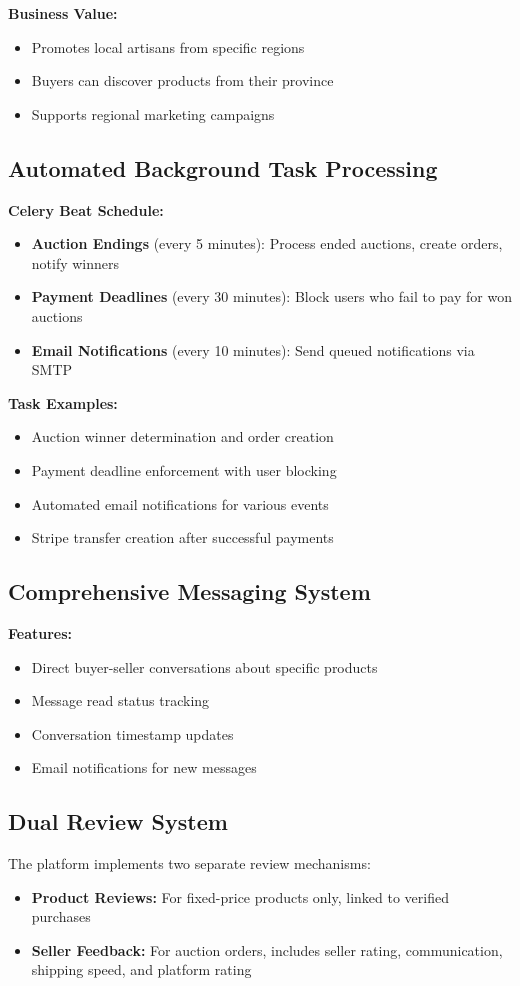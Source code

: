 \documentclass[12pt,a4paper]{article}
\begin{document}
\textbf{Business Value:}
\begin{itemize}
    \item Promotes local artisans from specific regions
    \item Buyers can discover products from their province
    \item Supports regional marketing campaigns
\end{itemize}

\subsection{Automated Background Task Processing}
\textbf{Celery Beat Schedule:}
\begin{itemize}
    \item \textbf{Auction Endings} (every 5 minutes): Process ended auctions, create orders, notify winners
    \item \textbf{Payment Deadlines} (every 30 minutes): Block users who fail to pay for won auctions
    \item \textbf{Email Notifications} (every 10 minutes): Send queued notifications via SMTP
\end{itemize}

\textbf{Task Examples:}
\begin{itemize}
    \item Auction winner determination and order creation
    \item Payment deadline enforcement with user blocking
    \item Automated email notifications for various events
    \item Stripe transfer creation after successful payments
\end{itemize}

\subsection{Comprehensive Messaging System}
\textbf{Features:}
\begin{itemize}
    \item Direct buyer-seller conversations about specific products
    \item Message read status tracking
    \item Conversation timestamp updates
    \item Email notifications for new messages
\end{itemize}

\subsection{Dual Review System}
The platform implements two separate review mechanisms:
\begin{itemize}
    \item \textbf{Product Reviews:} For fixed-price products only, linked to verified purchases
    \item \textbf{Seller Feedback:} For auction orders, includes seller rating, communication, shipping speed, and platform rating
\end{itemize}
\end{document}
